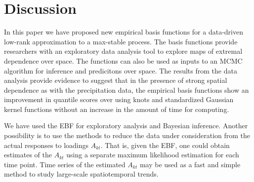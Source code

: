 \section{Discussion}\label{ebs:con}
In this paper we have proposed new empirical basis functions for a data-driven low-rank approximation to a max-stable process.
The basis functions provide researchers with an exploratory data analysis tool to explore maps of extremal dependence over space.
The functions can also be used as inputs to an MCMC algorithm for inference and predicitons over space.
The results from the data analysis provide evidence to suggest that in the presence of strong spatial dependence as with the precipitation data, the empirical basis functions show an improvement in quantile scores over using knots and standardized Gaussian kernel functions without an increase in the amount of time for computing.

We have used the EBF for exploratory analysis and Bayesian inference.
Another possibility is to use the methods to reduce the data under consideration from the actual responses to loadings $A_{kt}$.
That is, given the EBF, one could obtain estimates of the $A_{kt}$ using a separate maximum likelihood estimation for each time point.
Time series of the estimated $A_{kt}$ may be used as a fast and simple method to study large-scale spatiotemporal trends.

